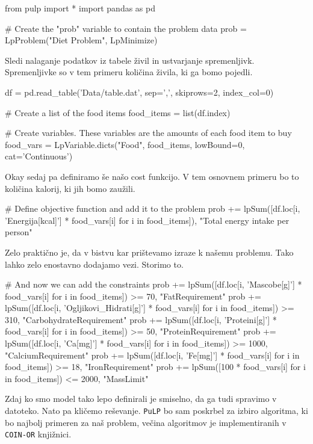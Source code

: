 \documentclass[a4paper]{article}
\begin{document}
\begin{pythonlst}
    from pulp import *
    import pandas as pd

    # Create the "prob"  variable to contain the problem data
    prob = LpProblem("Diet Problem", LpMinimize)
\end{pythonlst}

Sledi nalaganje podatkov iz tabele živil in ustvarjanje spremenljivk. Spremenljivke so v tem primeru
količina živila, ki ga bomo pojedli. 

\begin{pythonlst}
    df = pd.read_table('Data/table.dat', sep=',', skiprows=2, index_col=0)

    # Create a list of the food items
    food_items = list(df.index)

    # Create variables. These variables are the amounts of each food item to buy
    food_vars = LpVariable.dicts("Food", food_items, lowBound=0, cat='Continuous')
\end{pythonlst}

Okay sedaj pa definiramo še našo cost funkcijo. V tem osnovnem primeru bo to količina kalorij, ki jih
bomo zaužili.

\begin{pythonlst}
    # Define objective function and add it to the problem
    prob += lpSum([df.loc[i, 'Energija[kcal]'] * food_vars[i] for i in food_items]), "Total energy intake per person"
\end{pythonlst}

Zelo praktično je, da v bistvu kar prištevamo izraze k našemu problemu. Tako lahko zelo enostavno dodajamo
vezi. Storimo to.

\begin{pythonlst}
    # And now we can add the constraints
    prob += lpSum([df.loc[i, 'Mascobe[g]'] * food_vars[i] for i in food_items]) >= 70, "FatRequirement"
    prob += lpSum([df.loc[i, 'Ogljikovi_Hidrati[g]'] * food_vars[i] for i in food_items]) >= 310, "CarbohydrateRequirement"
    prob += lpSum([df.loc[i, 'Proteini[g]'] * food_vars[i] for i in food_items]) >= 50, "ProteinRequirement"
    prob += lpSum([df.loc[i, 'Ca[mg]'] * food_vars[i] for i in food_items]) >= 1000, "CalciumRequirement"
    prob += lpSum([df.loc[i, 'Fe[mg]'] * food_vars[i] for i in food_items]) >= 18, "IronRequirement"
    prob += lpSum([100 * food_vars[i] for i in food_items]) <= 2000, "MassLimit"
\end{pythonlst}

Zdaj ko smo model tako lepo definirali je smiselno, da ga tudi spravimo v datoteko. Nato pa kličemo 
reševanje. \texttt{PuLP} bo sam poskrbel za izbiro algoritma, ki bo najbolj primeren za naš problem, večina 
algoritmov je implementiranih v \texttt{COIN-OR} \cite{Forrest2023-wv} knjižnici.
\end{document}
